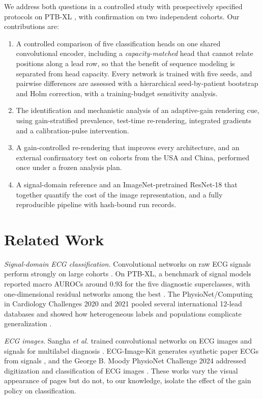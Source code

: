 \documentclass[journal]{IEEEtran}
\begin{document}
We address both questions in a controlled study with prospectively specified protocols on PTB-XL \cite{wagner2020ptbxl}, with confirmation on two independent cohorts. Our contributions are:
\begin{enumerate}
\item A controlled comparison of five classification heads on one shared convolutional encoder, including a \emph{capacity-matched} head that cannot relate positions along a lead row, so that the benefit of sequence modeling is separated from head capacity. Every network is trained with five seeds, and pairwise differences are assessed with a hierarchical seed-by-patient bootstrap and Holm correction, with a training-budget sensitivity analysis.
\item The identification and mechanistic analysis of an adaptive-gain rendering cue, using gain-stratified prevalence, test-time re-rendering, integrated gradients and a calibration-pulse intervention.
\item A gain-controlled re-rendering that improves every architecture, and an external confirmatory test on cohorts from the USA and China, performed once under a frozen analysis plan.
\item A signal-domain reference and an ImageNet-pretrained ResNet-18 that together quantify the cost of the image representation, and a fully reproducible pipeline with hash-bound run records.
\end{enumerate}

\section{Related Work}
\emph{Signal-domain ECG classification.} Convolutional networks on raw ECG signals perform strongly on large cohorts \cite{hannun2019cardiologist,ribeiro2020automatic}. On PTB-XL, a benchmark of signal models reported macro AUROCs around 0.93 for the five diagnostic superclasses, with one-dimensional residual networks among the best \cite{strodthoff2021benchmark,wang2017timeseries}. The PhysioNet/Computing in Cardiology Challenges 2020 and 2021 pooled several international 12-lead databases and showed how heterogeneous labels and populations complicate generalization \cite{perezalday2020challenge,reyna2021challenge,reyna2022issues}.

\emph{ECG images.} Sangha \emph{et al.} trained convolutional networks on ECG images and signals for multilabel diagnosis \cite{sangha2022images}. ECG-Image-Kit generates synthetic paper ECGs from signals \cite{shivashankara2024ecgimagekit}, and the George B. Moody PhysioNet Challenge 2024 addressed digitization and classification of ECG images \cite{reyna2024challenge,krones2024hough}. These works vary the visual appearance of pages but do not, to our knowledge, isolate the effect of the gain policy on classification.
\end{document}
